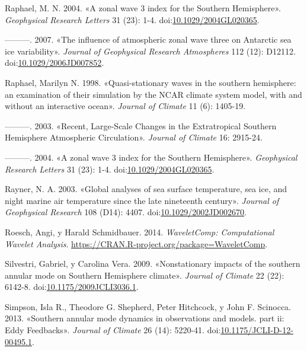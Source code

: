 \documentclass[spanish,a4paper,12p]{book}
\begin{document}
\hypertarget{ref-Raphael2004}{}
Raphael, M. N. 2004. «A zonal wave 3 index for the Southern Hemisphere».
\emph{Geophysical Research Letters} 31 (23): 1-4.
doi:\href{https://doi.org/10.1029/2004GL020365}{10.1029/2004GL020365}.

\hypertarget{ref-Raphael2007a}{}
---------. 2007. «The influence of atmospheric zonal wave three on
Antarctic sea ice variability». \emph{Journal of Geophysical Research
Atmospheres} 112 (12): D12112.
doi:\href{https://doi.org/10.1029/2006JD007852}{10.1029/2006JD007852}.

\hypertarget{ref-Raphael1998}{}
Raphael, Marilyn N. 1998. «Quasi-stationary waves in the southern
hemisphere: an examination of their simulation by the NCAR climate
system model, with and without an interactive ocean». \emph{Journal of
Climate} 11 (6): 1405-19.

\hypertarget{ref-Raphael2003}{}
---------. 2003. «Recent, Large-Scale Changes in the Extratropical
Southern Hemisphere Atmospheric Circulation». \emph{Journal of Climate}
16: 2915-24.

\hypertarget{ref-Raphael2004a}{}
---------. 2004. «A zonal wave 3 index for the Southern Hemisphere».
\emph{Geophysical Research Letters} 31 (23): 1-4.
doi:\href{https://doi.org/10.1029/2004GL020365}{10.1029/2004GL020365}.

\hypertarget{ref-Rayner2003}{}
Rayner, N. A. 2003. «Global analyses of sea surface temperature, sea
ice, and night marine air temperature since the late nineteenth
century». \emph{Journal of Geophysical Research} 108 (D14): 4407.
doi:\href{https://doi.org/10.1029/2002JD002670}{10.1029/2002JD002670}.

\hypertarget{ref-R-WaveletComp}{}
Roesch, Angi, y Harald Schmidbauer. 2014. \emph{WaveletComp:
Computational Wavelet Analysis}.
\url{https://CRAN.R-project.org/package=WaveletComp}.

\hypertarget{ref-Silvestri2009}{}
Silvestri, Gabriel, y Carolina Vera. 2009. «Nonstationary impacts of the
southern annular mode on Southern Hemisphere climate». \emph{Journal of
Climate} 22 (22): 6142-8.
doi:\href{https://doi.org/10.1175/2009JCLI3036.1}{10.1175/2009JCLI3036.1}.

\hypertarget{ref-Simpson2013}{}
Simpson, Isla R., Theodore G. Shepherd, Peter Hitchcock, y John F.
Scinocca. 2013. «Southern annular mode dynamics in observations and
models. part ii: Eddy Feedbacks». \emph{Journal of Climate} 26 (14):
5220-41.
doi:\href{https://doi.org/10.1175/JCLI-D-12-00495.1}{10.1175/JCLI-D-12-00495.1}.
\end{document}
